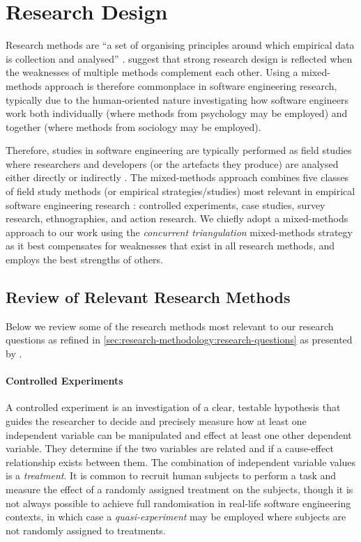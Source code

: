 \section{Research Design}
\label{sec:research-methodology:review}

Research methods are ``a set of organising principles around which empirical data is collection and analysed'' \citep{Easterbrook:2007ws}. \citet{Creswell:2017vn} suggest that strong research design is reflected when the weaknesses of multiple methods complement each other. Using a mixed-methods approach is therefore commonplace in software engineering research, typically due to the human-oriented nature investigating how software engineers work both individually (where methods from psychology may be employed) and together (where methods from sociology may be employed). 

Therefore, studies in software engineering are typically performed as field studies where researchers and developers (or the artefacts they produce) are analysed either directly or indirectly \citep{Singer:2007tu}. The mixed-methods approach combines five classes of field study methods (or empirical strategies/studies) most relevant in empirical software engineering research \citep{Easterbrook:2007ws, Wohlin:2012bu, Juristo:2013vj}: controlled experiments, case studies, survey research, ethnographies, and action research. We chiefly adopt a mixed-methods approach to our work using the \textit{concurrent triangulation} mixed-methods strategy \citep{Jick:1979el} as it best compensates for weaknesses that exist in all research methods, and employs the best strengths of others.



\subsection{Review of Relevant Research Methods}
\label{ssec:research-methodology:review:methods}

Below we review some of the research methods most relevant to our research questions as refined in \cref{sec:research-methodology:research-questions} as presented by \citet{Easterbrook:2007ws}.

\paragraph{Controlled Experiments}
A controlled experiment is an investigation of a clear, testable hypothesis that guides the researcher to decide and precisely measure how at least one independent variable can be manipulated and effect at least one other dependent variable. They determine if the two variables are related and if a cause-effect relationship exists between them. The combination of independent variable values is a \textit{treatment}. It is common to recruit human subjects to perform a task and measure the effect of a randomly assigned treatment on the subjects, though it is not always possible to achieve full randomisation in real-life software engineering contexts, in which case a \textit{quasi-experiment} may be employed where subjects are not randomly assigned to treatments.

